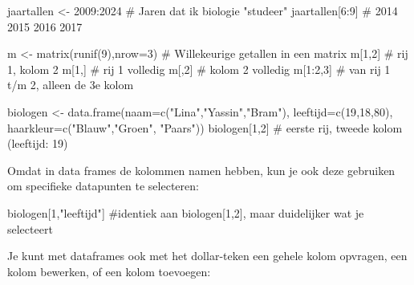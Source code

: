 \documentclass[
  a4paper,
]{scrbook}
\newenvironment{Shaded}{\begin{snugshade}}{\end{snugshade}}
\newcommand{\AttributeTok}[1]{\textcolor[rgb]{0.40,0.45,0.13}{#1}}
\newcommand{\CommentTok}[1]{\textcolor[rgb]{0.37,0.37,0.37}{#1}}
\newcommand{\DecValTok}[1]{\textcolor[rgb]{0.68,0.00,0.00}{#1}}
\newcommand{\FunctionTok}[1]{\textcolor[rgb]{0.28,0.35,0.67}{#1}}
\newcommand{\NormalTok}[1]{\textcolor[rgb]{0.00,0.23,0.31}{#1}}
\newcommand{\OtherTok}[1]{\textcolor[rgb]{0.00,0.23,0.31}{#1}}
\newcommand{\SpecialCharTok}[1]{\textcolor[rgb]{0.37,0.37,0.37}{#1}}
\newcommand{\StringTok}[1]{\textcolor[rgb]{0.13,0.47,0.30}{#1}}
\theoremstyle{definition}
\theoremstyle{remark}
\begin{document}
\begin{Shaded}
\begin{Highlighting}[]
\NormalTok{jaartallen }\OtherTok{\textless{}{-}} \DecValTok{2009}\SpecialCharTok{:}\DecValTok{2024}         \CommentTok{\# Jaren dat ik biologie "studeer"}
\NormalTok{jaartallen[}\DecValTok{6}\SpecialCharTok{:}\DecValTok{9}\NormalTok{]                 }\CommentTok{\# 2014 2015 2016 2017}

\NormalTok{m }\OtherTok{\textless{}{-}} \FunctionTok{matrix}\NormalTok{(}\FunctionTok{runif}\NormalTok{(}\DecValTok{9}\NormalTok{),}\AttributeTok{nrow=}\DecValTok{3}\NormalTok{)    }\CommentTok{\# Willekeurige getallen in een matrix}
\NormalTok{m[}\DecValTok{1}\NormalTok{,}\DecValTok{2}\NormalTok{]    }\CommentTok{\# rij 1, kolom 2}
\NormalTok{m[}\DecValTok{1}\NormalTok{,]     }\CommentTok{\# rij 1 volledig}
\NormalTok{m[,}\DecValTok{2}\NormalTok{]     }\CommentTok{\# kolom 2 volledig}
\NormalTok{m[}\DecValTok{1}\SpecialCharTok{:}\DecValTok{2}\NormalTok{,}\DecValTok{3}\NormalTok{]  }\CommentTok{\# van rij 1 t/m 2, alleen de 3e kolom}

\NormalTok{biologen }\OtherTok{\textless{}{-}} \FunctionTok{data.frame}\NormalTok{(}\AttributeTok{naam=}\FunctionTok{c}\NormalTok{(}\StringTok{"Lina"}\NormalTok{,}\StringTok{"Yassin"}\NormalTok{,}\StringTok{"Bram"}\NormalTok{),}
                       \AttributeTok{leeftijd=}\FunctionTok{c}\NormalTok{(}\DecValTok{19}\NormalTok{,}\DecValTok{18}\NormalTok{,}\DecValTok{80}\NormalTok{), }
                       \AttributeTok{haarkleur=}\FunctionTok{c}\NormalTok{(}\StringTok{"Blauw"}\NormalTok{,}\StringTok{"Groen"}\NormalTok{, }\StringTok{"Paars"}\NormalTok{))}
\NormalTok{biologen[}\DecValTok{1}\NormalTok{,}\DecValTok{2}\NormalTok{] }\CommentTok{\# eerste rij, tweede kolom (leeftijd: 19)}
\end{Highlighting}
\end{Shaded}

Omdat in data frames de kolommen namen hebben, kun je ook deze gebruiken
om specifieke datapunten te selecteren:

\begin{Shaded}
\begin{Highlighting}[]
\NormalTok{biologen[}\DecValTok{1}\NormalTok{,}\StringTok{"leeftijd"}\NormalTok{] }\CommentTok{\#identiek aan biologen[1,2], maar duidelijker wat je selecteert}
\end{Highlighting}
\end{Shaded}

Je kunt met dataframes ook met het dollar-teken een gehele kolom
opvragen, een kolom bewerken, of een kolom toevoegen:
\end{document}
